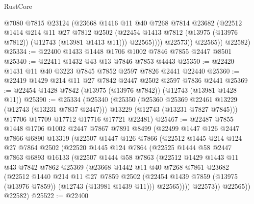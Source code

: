 \begin{lexlean}{RustCore}
\begin{coremodule}
                  @7080
                  @7815
                  @23124
                  (@23668
                    @1416
                    @11
                    @40
                    @7268
                    @7814
                    @23682
                    (@22512
                      @1414
                      @214
                      @11
                      @27
                      @7812
                      @2502
                      (@22454 @1413 @7812 (@13975 (@13976 @7812)) (@12743 (@13981 @1413 @11)))
                      @22565))))
              @22573))
          @22565))
      @22582)
@25334 := @22400 @1433 @1448 @1706 @1002 @7846 @7855 @2447 @8501
@25340 := @22411 @1432 @43 @13 @7846 @7853 @4443
@25350 := @22420 @1431 @11 @40 @3223 @7845 @7852 @2597 @7826 @2441 @22440
@25360 := @22419 @1429 @214 @11 @27 @7842 @2447 @2502 @2597 @7836 @2441
@25369 := @22454 @1428 @7842 (@13975 (@13976 @7842)) (@12743 (@13981 @1428 @11))
@25390 := @25334
    (@25340
      (@25350
        (@25360 @25369 @22461 @13229 (@12743 (@13231 @7837 @2447)))
        @13229
        (@12743 (@13231 @7827 @7845)))
      @17706
      @17709
      @17712
      @17716
      @17721
      @22481)
@25467 := @22487
    @7855
    @1448
    @1706
    @1002
    @2447
    @7867
    @7891
    @8499
    (@22499
      @1447
      @126
      @2447
      @7866
      @6890
      @13319
      (@22507
        @1447
        @126
        @7866
        (@22512
          @1445
          @214
          @124
          @27
          @7864
          @2502
          (@22520
            @1445
            @124
            @7864
            (@22525
              @1444
              @58
              @2447
              @7863
              @6893
              @16133
              (@22507
                @1444
                @58
                @7863
                (@22512
                  @1429
                  @1443
                  @11
                  @43
                  @7842
                  @7862
                  @25369
                  (@23668
                    @1442
                    @11
                    @40
                    @7268
                    @7861
                    @23682
                    (@22512
                      @1440
                      @214
                      @11
                      @27
                      @7859
                      @2502
                      (@22454 @1439 @7859 (@13975 (@13976 @7859)) (@12743 (@13981 @1439 @11)))
                      @22565))))
              @22573))
          @22565))
      @22582)
@25522 := @22400

\end{coremodule}
\end{lexlean}
